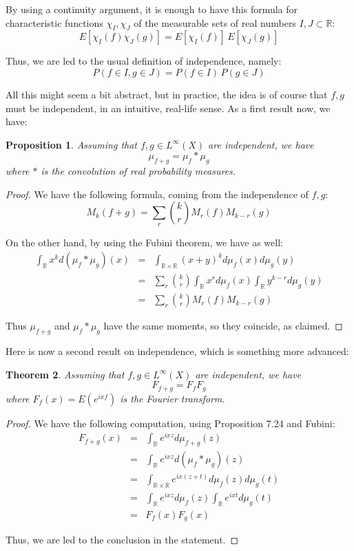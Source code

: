 \documentclass[12pt]{amsbook}
\newtheorem{theorem}{Theorem}[chapter]
\newtheorem{proposition}[theorem]{Proposition}
\begin{document}
By using a continuity argument, it is enough to have this formula for characteristic functions $\chi_I,\chi_J$ of the measurable sets of real numbers $I,J\subset\mathbb R$:
$$E[\chi_I(f)\chi_J(g)]=E[\chi_I(f)]\,E[\chi_J(g)]$$

Thus, we are led to the usual definition of independence, namely:
$$P(f\in I,g\in J)=P(f\in I)\,P(g\in J)$$

All this might seem a bit abstract, but in practice, the idea is of course that $f,g$ must be independent, in an intuitive, real-life sense. As a first result now, we have:


\begin{proposition}
Assuming that $f,g\in L^\infty(X)$ are independent, we have
$$\mu_{f+g}=\mu_f*\mu_g$$
where $*$ is the convolution of real probability measures.
\end{proposition}

\begin{proof}
We have the following formula, coming from the independence of $f,g$:
$$M_k(f+g)
=\sum_r\binom{k}{r}M_r(f)M_{k-r}(g)$$

On the other hand, by using the Fubini theorem, we have as well:
\begin{eqnarray*}
\int_\mathbb Rx^kd(\mu_f*\mu_g)(x)
&=&\int_{\mathbb R\times\mathbb R}(x+y)^kd\mu_f(x)d\mu_g(y)\\
&=&\sum_r\binom{k}{r}\int_\mathbb Rx^rd\mu_f(x)\int_\mathbb Ry^{k-r}d\mu_g(y)\\
&=&\sum_r\binom{k}{r}M_r(f)M_{k-r}(g)
\end{eqnarray*}

Thus $\mu_{f+g}$ and $\mu_f*\mu_g$ have the same moments, so they coincide, as claimed.
\end{proof}

Here is now a second result on independence, which is something more advanced:


\begin{theorem}
Assuming that $f,g\in L^\infty(X)$ are independent, we have
$$F_{f+g}=F_fF_g$$
where $F_f(x)=E(e^{ixf})$ is the Fourier transform.
\end{theorem}

\begin{proof}
We have the following computation, using Proposition 7.24 and Fubini:
\begin{eqnarray*}
F_{f+g}(x)
&=&\int_\mathbb Re^{ixz}d\mu_{f+g}(z)\\
&=&\int_\mathbb Re^{ixz}d(\mu_f*\mu_g)(z)\\
&=&\int_{\mathbb R\times\mathbb R}e^{ix(z+t)}d\mu_f(z)d\mu_g(t)\\
&=&\int_\mathbb Re^{ixz}d\mu_f(z)\int_\mathbb Re^{ixt}d\mu_g(t)\\
&=&F_f(x)F_g(x)
\end{eqnarray*}

Thus, we are led to the conclusion in the statement.
\end{proof}
\end{document}

